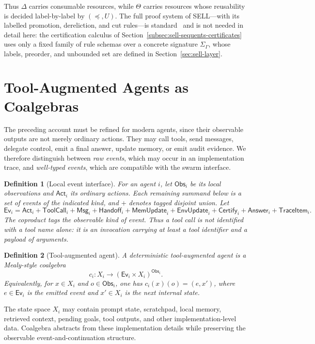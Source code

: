 \documentclass[a4paper,fleqn]{cas-sc}
\newtheorem{definition}{Definition}
\newcommand{\Obs}{\mathsf{Obs}}
\newcommand{\Act}{\mathsf{Act}}
\newcommand{\Msg}{\mathsf{Msg}}
\newcommand{\Ev}{\mathsf{Ev}}
\newcommand{\Handoff}{\mathsf{Handoff}}
\begin{document}
Thus \(\Delta\) carries consumable resources, while \(\Theta\) carries resources whose reusability is decided label-by-label by \((\preceq,U)\). The full proof system of SELL---with its labelled promotion, dereliction, and cut rules---is standard~\cite{nigam2009,despeyroux2017} and is not needed in detail here: the certification calculus of Section~\ref{subsec:sell-sequents-certificates} uses only a fixed family of rule schemas over a concrete signature \(\Sigma_{\Gamma}\), whose labels, preorder, and unbounded set are defined in Section~\ref{sec:sell-layer}.


\section{Tool-Augmented Agents as Coalgebras}

The preceding account must be refined for modern agents, since their observable outputs are not merely ordinary actions. They may call tools, send messages, delegate control, emit a final answer, update memory, or emit audit evidence. We therefore distinguish between \emph{raw events}, which may occur in an implementation trace, and \emph{well-typed events}, which are compatible with the swarm interface.

\begin{definition}[Local event interface]
For an agent \(i\), let \(\Obs_i\) be its local observations and
\(\Act_i\) its ordinary actions. Each remaining summand below is a set of
events of the indicated kind, and \(+\) denotes tagged disjoint union. Let
\[
  \Ev_i
  =
  \Act_i
  + \mathsf{ToolCall}_i
  + \Msg_i
  + \Handoff_i
  + \mathsf{MemUpdate}_i
  + \mathsf{EnvUpdate}_i
  + \mathsf{Certify}_i
  + \mathsf{Answer}_i
  + \mathsf{TraceItem}_i.
\]
The coproduct tags the observable kind of event. Thus a tool call is not identified with a tool name alone: it is an invocation carrying at least a tool identifier and a payload of arguments.
\end{definition}

\begin{definition}[Tool-augmented agent]
A deterministic tool-augmented agent is a Mealy-style coalgebra
\[
  c_i:X_i\to(\Ev_i\times X_i)^{\Obs_i}.
\]
Equivalently, for \(x\in X_i\) and \(o\in\Obs_i\), one has \(c_i(x)(o)=(e,x')\), where \(e\in\Ev_i\) is the emitted event and \(x'\in X_i\) is the next internal state.
\end{definition}

The state space \(X_i\) may contain prompt state, scratchpad, local memory, retrieved context, pending goals, tool outputs, and other implementation-level data. Coalgebra abstracts from these implementation details while preserving the observable event-and-continuation structure.
\end{document}
